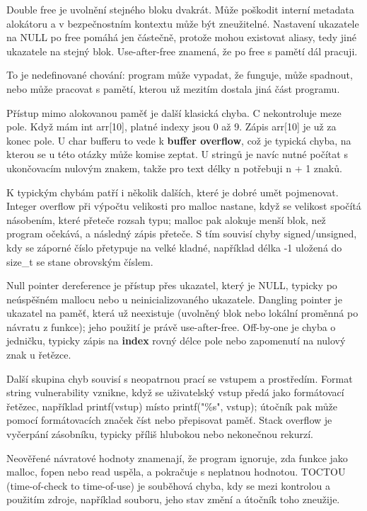 \documentclass[11pt,a4paper]{article}
\begin{document}
Double free je uvolnění stejného bloku dvakrát. Může poškodit interní metadata alokátoru a v bezpečnostním kontextu může být zneužitelné. Nastavení ukazatele na NULL po free pomáhá jen částečně, protože mohou existovat aliasy, tedy jiné ukazatele na stejný blok. Use-after-free znamená, že po free s pamětí dál pracuji.

To je nedefinované chování: program může vypadat, že funguje, může spadnout, nebo může pracovat s pamětí, kterou už mezitím dostala jiná část programu.

Přístup mimo alokovanou paměť je další klasická chyba. C nekontroluje meze pole. Když mám int arr[10], platné indexy jsou 0 až 9. Zápis arr[10] je už za konec pole. U char bufferu to vede k \textbf{buffer overflow}, což je typická chyba, na kterou se u této otázky může komise zeptat. U stringů je navíc nutné počítat s ukončovacím nulovým znakem, takže pro text délky n potřebuji n + 1 znaků.

K typickým chybám patří i několik dalších, které je dobré umět pojmenovat. Integer overflow při výpočtu velikosti pro malloc nastane, když se velikost spočítá násobením, které přeteče rozsah typu; malloc pak alokuje menší blok, než program očekává, a následný zápis přeteče. S tím souvisí chyby signed/unsigned, kdy se záporné číslo přetypuje na velké kladné, například délka -1 uložená do size\_t se stane obrovským číslem.

Null pointer dereference je přístup přes ukazatel, který je NULL, typicky po neúspěšném mallocu nebo u neinicializovaného ukazatele. Dangling pointer je ukazatel na paměť, která už neexistuje (uvolněný blok nebo lokální proměnná po návratu z funkce); jeho použití je právě use-after-free. Off-by-one je chyba o jedničku, typicky zápis na \textbf{index} rovný délce pole nebo zapomenutí na nulový znak u řetězce.

Další skupina chyb souvisí s neopatrnou prací se vstupem a prostředím. Format string vulnerability vznikne, když se uživatelský vstup předá jako formátovací řetězec, například printf(vstup) místo printf("\%s", vstup); útočník pak může pomocí formátovacích značek číst nebo přepisovat paměť. Stack overflow je vyčerpání zásobníku, typicky příliš hlubokou nebo nekonečnou rekurzí.

Neověřené návratové hodnoty znamenají, že program ignoruje, zda funkce jako malloc, fopen nebo read uspěla, a pokračuje s neplatnou hodnotou. TOCTOU (time-of-check to time-of-use) je souběhová chyba, kdy se mezi kontrolou a použitím zdroje, například souboru, jeho stav změní a útočník toho zneužije.
\end{document}
